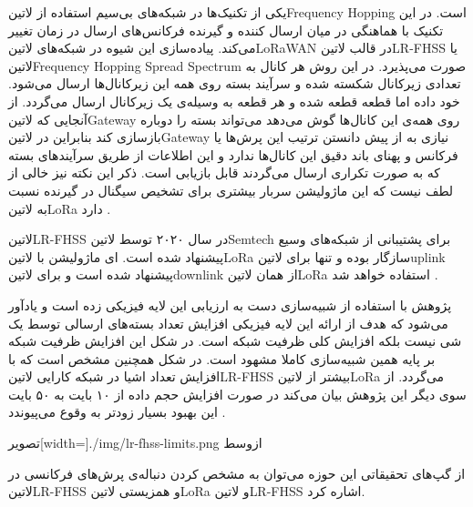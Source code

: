 
یکی از تکنیک‌ها در شبکه‌های بی‌سیم استفاده از ‌لاتین{Frequency Hopping} است. در این تکنیک با هماهنگی در میان ارسال کننده و گیرنده فرکانس‌های ارسال در زمان
تغییر می‌کند. پیاده‌سازی این شیوه در شبکه‌های ‌لاتین{LoRaWAN} در قالب ‌لاتین{LR-FHSS} یا
‌لاتین{Frequency Hopping Spread Spectrum}
صورت می‌پذیرد. در این روش هر کانال به تعدادی زیرکانال شکسته شده و سرآیند بسته روی همه این زیرکانال‌ها ارسال می‌شود.
خود داده اما قطعه قطعه شده و هر قطعه به وسیله‌ی یک زیرکانال ارسال می‌گردد.
از آنجایی که ‌لاتین{Gateway} روی همه‌ی این کانال‌ها گوش می‌دهد می‌تواند بسته را دوباره بازسازی کند بنابراین
در ‌لاتین{Gateway} نیازی به از پیش دانستن ترتیب این پرش‌ها یا فرکانس و پهنای باند دقیق این کانال‌ها ندارد
و این اطلاعات از طریق سرآیندهای بسته که به صورت تکراری ارسال می‌گردند قابل بازیابی است.
ذکر این نکته نیز خالی از لطف نیست که این ماژولیشن سربار بیشتری برای تشخیص سیگنال در گیرنده نسبت به ‌لاتین{LoRa} دارد
.

‌لاتین{LR-FHSS} در سال ۲۰۲۰ توسط ‌لاتین{Semtech} برای پشتیبانی از شبکه‌های وسیع پیشنهاد شده است.
ای ماژولیشن با ‌لاتین{LoRa} سازگار بوده و تنها برای ‌لاتین{uplink} پیشنهاد شده است و برای ‌لاتین{downlink} از همان
‌لاتین{LoRa} استفاده خواهد شد
.

پژوهش  با استفاده از شبیه‌سازی دست به ارزیابی این لایه فیزیکی زده است و یادآور می‌شود که هدف از ارائه این لایه فیزیکی
افزایش تعداد بسته‌های ارسالی توسط یک شی نیست بلکه افزایش کلی ظرفیت شبکه است. در شکل  این افزایش ظرفیت شبکه بر پایه همین
شبیه‌سازی کاملا مشهود است. در شکل  همچنین مشخص است که با افزایش تعداد اشیا در شبکه کارایی ‌لاتین{LR-FHSS} بیشتر از ‌لاتین{LoRa}
می‌گردد. از سوی دیگر این پژوهش بیان می‌کند در صورت افزایش حجم داده از ۱۰ بایت به ۵۰ بایت این بهبود بسیار زودتر به وقوع می‌پیوندد
.

‌تصویر[width=\textwidth]{./img/lr-fhss-limits.png}
‌ازوسط

از گپ‌های تحقیقاتی این حوزه می‌توان به مشخص کردن دنباله‌ی پرش‌های فرکانسی در ‌لاتین{LR-FHSS} و همزیستی ‌لاتین{LoRa} و ‌لاتین{LR-FHSS} اشاره کرد.


